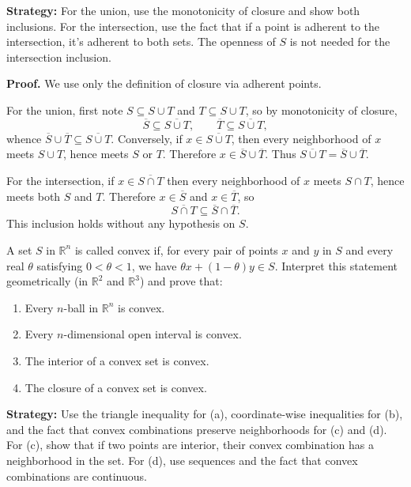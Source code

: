 \noindent\textbf{Strategy:} For the union, use the monotonicity of closure and show both inclusions. For the intersection, use the fact that if a point is adherent to the intersection, it's adherent to both sets. The openness of $S$ is not needed for the intersection inclusion.

\noindent\textbf{Proof.}
We use only the definition of closure via adherent points.

For the union, first note $S\subseteq S\cup T$ and $T\subseteq S\cup T$, so by monotonicity of closure,
\[\overline S\subseteq \overline{S\cup T},\qquad \overline T\subseteq \overline{S\cup T},\]
whence $\overline S\cup\overline T\subseteq \overline{S\cup T}$. Conversely, if $x\in \overline{S\cup T}$, then every neighborhood of $x$ meets $S\cup T$, hence meets $S$ or $T$. Therefore $x\in\overline S\cup\overline T$. Thus $\overline{S\cup T}=\overline S\cup\overline T$.

For the intersection, if $x\in \overline{S\cap T}$ then every neighborhood of $x$ meets $S\cap T$, hence meets both $S$ and $T$. Therefore $x\in\overline S$ and $x\in\overline T$, so
\[\overline{S\cap T}\subseteq \overline S\cap \overline T.\]
This inclusion holds without any hypothesis on $S$.



\begin{problembox}
A set \( S \) in \( \mathbb{R}^n \) is called convex if, for every pair of points \( x \) and \( y \) in \( S \) and every real \( \theta \) satisfying \( 0 < \theta < 1 \), we have \( \theta x + (1 - \theta)y \in S \). Interpret this statement geometrically (in \( \mathbb{R}^2 \) and \( \mathbb{R}^3 \)) and prove that:
\begin{enumerate}[label=\alph*)]
\item Every \( n \)-ball in \( \mathbb{R}^n \) is convex.
\item Every \( n \)-dimensional open interval is convex.
\item The interior of a convex set is convex.
\item The closure of a convex set is convex.
\end{enumerate}
\end{problembox}

\noindent\textbf{Strategy:} Use the triangle inequality for (a), coordinate-wise inequalities for (b), and the fact that convex combinations preserve neighborhoods for (c) and (d). For (c), show that if two points are interior, their convex combination has a neighborhood in the set. For (d), use sequences and the fact that convex combinations are continuous.

